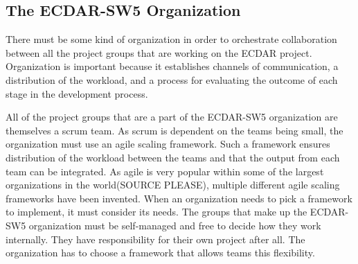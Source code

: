 \subsection{The ECDAR-SW5 Organization}
There must be some kind of organization in order to orchestrate collaboration between all the project groups that are working on the ECDAR project. 
Organization is important because it establishes channels of communication, a distribution of the workload, and a process for evaluating the outcome of each stage in the development process.

All of the project groups that are a part of the ECDAR-SW5 organization are themselves a scrum team. 
As scrum is dependent on the teams being small, the organization must use an agile scaling framework. 
Such a framework ensures distribution of the workload between the teams and that the output from each team can be integrated. 
As agile is very popular within some of the largest organizations in the world(SOURCE PLEASE), multiple different agile scaling frameworks have been invented. 
When an organization needs to pick a framework to implement, it must consider its needs. 
The groups that make up the ECDAR-SW5 organization must be self-managed and free to decide how they work internally. They have responsibility for their own project after all. The organization has to choose a framework that allows teams this flexibility.